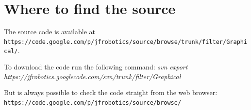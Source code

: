 \documentclass{article}
\begin{document}
\section{Where to find the source}

The source code is available at \texttt{https://code.google.com/p/jfrobotics/source/browse/trunk/filter/Graphical/}.

To download the code run the following command:
\textit{svn export https://jfrobotics.googlecode.com/svn/trunk/filter/Graphical}

But is always possible to check the code straight from the web browser:
\texttt{https://code.google.com/p/jfrobotics/source/browse/}
\end{document}
